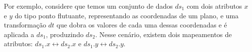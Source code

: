 Por exemplo, considere que temos um conjunto de dados \( ds_{1} \) com dois atributos \( x \) e \( y \) do tipo ponto flutuante, representando as coordenadas de um plano, e uma transformação \( dt \) que dobra os valores de cada uma dessas coordenadas e é aplicada a \( ds_{1} \), produzindo \( ds_{2} \). Nesse cenário, existem dois mapeamentos de atributos: \( ds_{1}.x \leftrightarrow ds_{2}.x \) e \( ds_{1}.y \leftrightarrow ds_{2}.y \).

